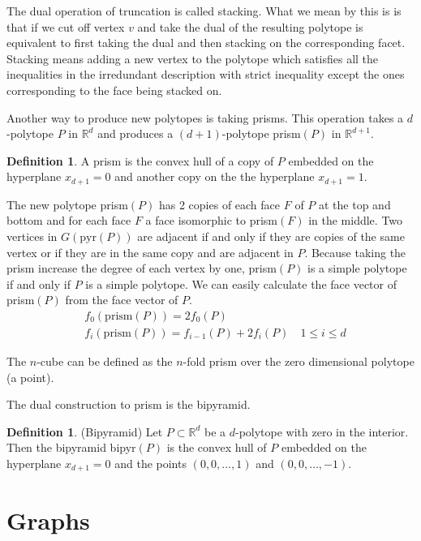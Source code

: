 \documentclass[a4paper,12pt]{book}
\theoremstyle{plain}
\theoremstyle{definition}
\newtheorem{definition}[theorem]{Definition}
\begin{document}
The dual operation of truncation is called stacking. What we mean by this is is that if we cut off vertex $v$
and take the dual of the resulting polytope is equivalent to first taking the dual and then stacking on the
corresponding facet.
Stacking means adding a new vertex to the polytope which satisfies all the 
inequalities in the irredundant description with strict inequality except the 
ones corresponding to the face being stacked on.

Another way to produce new polytopes is taking prisms. This operation takes a 
$d$-polytope $P$ in $\mathbb{R}^d$ and produces a $(d+1)$-polytope prism$(P)$ in 
$\mathbb{R}^{d+1}$. 
\begin{definition}
 A prism is the convex hull of a copy of $P$ embedded on the hyperplane 
$x_{d+1} = 0$ and another copy on the the hyperplane $x_{d+1} = 1$.
\end{definition}

 The new polytope prism$(P)$ has 2 copies of 
each face $F$ of $P$ at the top and bottom and for each face $F$ a face isomorphic to 
prism$(F)$ in the middle. Two vertices in $G(\text{pyr}(P))$ are adjacent if and only if
they are copies of the same vertex or if they are in the same copy and are 
adjacent in $P$. Because taking the prism increase the degree of each vertex by one, prism$(P)$ 
is a simple polytope if and only if $P$ is a simple polytope. We can easily calculate
the face vector of prism$(P)$ from the face vector of $P$.
\begin{align}
& f_0(\textrm{prism}(P)) = 2f_0(P) \\
& f_i(\textrm{prism}(P)) = f_{i-1}(P) + 2f_i(P) \quad 1 \le i \le d
\end{align}


The $n$-cube can be defined as the $n$-fold 
prism over the zero dimensional polytope (a point). 

The dual construction to prism 
is the bipyramid. 
\begin{definition}
 (Bipyramid) Let $P\subset \mathbb{R}^d$ be a $d$-polytope with zero in the 
interior. Then the bipyramid bipyr$(P)$ is the convex hull of $P$ embedded on 
the hyperplane $x_{d+1} = 0$ and the points $(0,0,\dots, 1)$ and $(0,0,\dots, 
-1)$.
\end{definition}


\section{Graphs}
\end{document}
